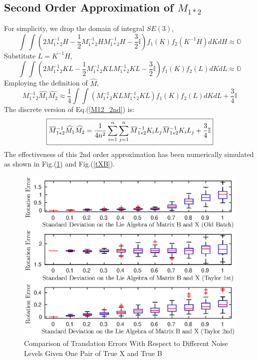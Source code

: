 \documentclass[twocolumn,10pt]{asme2ej}
\newcommand{\II}{\mathbb{I}}
\newcommand{\overbar}[1]{\mkern 1.5mu\overline{\mkern-1.5mu#1\mkern-1.5mu}\mkern 1.5mu}
\begin{document}
\subsection{Second Order Approximation of $M_{1*2}$}
For simplicity, we drop the domain of integral $SE(3)$,
\begin{equation}
\int\int\left(2M_{1*2}^{-1}H - \dfrac{1}{2}M_{1*2}^{-1}HM_{1*2}^{-1}H - \dfrac{3}{2}\II \right)f_{1}(K)f_{2}(K^{-1}H)dKdH \approx \mathbb{O}
\end{equation}
Substitute $L = K^{-1}H$,
\begin{equation}
\int\int \left(2M_{1*2}^{-1}KL - \dfrac{1}{2}M_{1*2}^{-1}KLM_{1*2}^{-1}KL - \dfrac{3}{2}\II \right)f_{1}(K)f_{2}(L)dKdL \approx \mathbb{O}
\end{equation}
Employing the definition of $\widehat{M}$,
\begin{equation}
M_{1*2}^{-1}\widehat{M_{1}}\widehat{M_{2}} \approx \dfrac{1}{4} \int\int \left(M_{1*2}^{-1}KLM_{1*2}^{-1}KL \right)f_{1}(K)f_{2}(L)dKdL + \dfrac{3}{4}\II
\label{M12_2nd} 
\end{equation}
The discrete version of Eq.(\ref{M12_2nd}) is: 
\begin{equation}
\boxed{
\overbar{M}_{1*2}^{-1}\widehat{M_{1}}\widehat{M_{2}} = \dfrac{1}{4n^2} \sum_{i=1}^n \sum_{j=1}^n \overbar{M}_{1*2}^{-1}K_i L_j \overbar{M}_{1*2}^{-1}K_i L_j  + \dfrac{3}{4}\II
}
\label{2nd12}
\end{equation}
The effectiveness of this 2nd order approximation has been numerically simulated as shown in Fig.(\ref{rotXB}) and Fig.(\ref{tXB}). 

\begin{figure}[h]
\includegraphics[scale=0.6]{col_mean_rot_error_1_10.eps}
\caption{Comparison of Translation Errors With Respect to Different Noise Levels Given One Pair of True X and True B}
\centering
\label{rotXB}
\end{figure}
\end{document}
